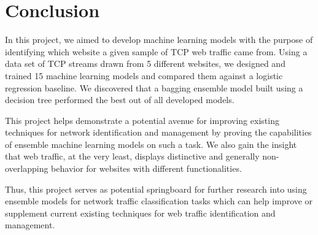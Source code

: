 \documentclass[10pt,sigconf,letterpaper,nonacm]{acmart}
\begin{document}
\section{Conclusion}

In this project, we aimed to develop machine learning models with the purpose of identifying which website a given sample of TCP web traffic came from.
Using a data set of TCP streams drawn from 5 different websites, we designed and trained 15 machine learning models and compared them against a logistic regression baseline.
We discovered that a bagging ensemble model built using a decision tree performed the best out of all developed models.

This project helps demonstrate a potential avenue for improving existing techniques for network identification and management by proving the capabilities of ensemble machine learning models on such a task.
We also gain the insight that web traffic, at the very least, displays distinctive and generally non-overlapping behavior for websites with different functionalities.

Thus, this project serves as potential springboard for further research into using ensemble models for network traffic classification tasks which can help improve or supplement current existing techniques for web traffic identification and management.




\nocite{*}

\end{document}

